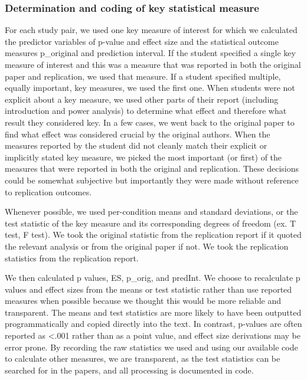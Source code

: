 \documentclass[
  english,
  a4paper,
]{article}
\begin{document}
\hypertarget{determination-and-coding-of-key-statistical-measure}{%
\subsubsection{Determination and coding of key statistical measure}\label{determination-and-coding-of-key-statistical-measure}}

For each study pair, we used one key measure of interest for which we calculated the predictor variables of p-value and effect size and the statistical outcome measures p\_original and prediction interval.
If the student specified a single key measure of interest and this was a measure that was reported in both the original paper and replication, we used that measure. If a student specified multiple, equally important, key measures, we used the first one. When students were not explicit about a key measure, we used other parts of their report (including introduction and power analysis) to determine what effect and therefore what result they considered key. In a few cases, we went back to the original paper to find what effect was considered crucial by the original authors. When the measures reported by the student did not cleanly match their explicit or implicitly stated key measure, we picked the most important (or first) of the measures that were reported in both the original and replication. These decisions could be somewhat subjective but importantly they were made without reference to replication outcomes.

Whenever possible, we used per-condition means and standard deviations, or the test statistic of the key measure and its corresponding degrees of freedom (ex. T test, F test). We took the original statistic from the replication report if it quoted the relevant analysis or from the original paper if not. We took the replication statistics from the replication report.

We then calculated p values, ES, p\_orig, and predInt. We choose to recalculate p values and effect sizes from the means or test statistic rather than use reported measures when possible because we thought this would be more reliable and transparent. The means and test statistics are more likely to have been outputted programmatically and copied directly into the text. In contrast, p-values are often reported as \textless.001 rather than as a point value, and effect size derivations may be error prone. By recording the raw statistics we used and using our available code to calculate other measures, we are transparent, as the test statistics can be searched for in the papers, and all processing is documented in code.
\end{document}
